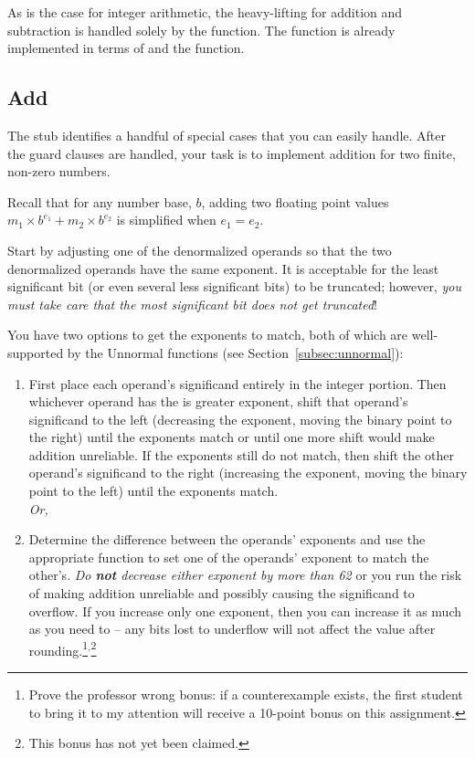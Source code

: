 As is the case for integer arithmetic, the heavy-lifting for addition and subtraction is handled solely by the  function.
The  function is already implemented in terms of  and the  function.

\subsection{Add}

The  stub identifies a handful of special cases that you can easily handle.
After the guard clauses are handled, your task is to implement addition for two finite, non-zero numbers.

Recall that for any number base, $b$, adding two floating point values $m_1 \times b^{e_1} + m_2 \times b^{e_2}$ is simplified when $e_1 = e_2$.

Start by adjusting one of the denormalized operands so that the two denormalized operands have the same exponent.
It is acceptable for the least significant bit (or even several less significant bits) to be truncated;
however, \textit{you must take care that the most significant bit does not get truncated}!

You have two options to get the exponents to match, both of which are well-supported by the Unnormal functions (see Section~\ref{subsec:unnormal}):
\begin{enumerate}
    \item First place each operand's significand entirely in the integer portion.
        Then whichever operand has the is greater exponent, shift that operand's significand to the left (decreasing the exponent, moving the binary point to the right) until the exponents match or until one more shift would make addition unreliable.
        If the exponents still do not match, then shift the other operand's significand to the right (increasing the exponent, moving the binary point to the left) until the exponents match. \\ \textit{Or,}
    \item Determine the difference between the operands' exponents and use the appropriate function to set one of the operands' exponent to match the other's.
        \textit{Do \textbf{not} decrease either exponent by more than 62} or you run the risk of making addition unreliable and possibly causing the significand to overflow.
        If you increase only one exponent, then you can increase it as much as you need to -- any bits lost to underflow will not affect the value after rounding.\footnote{
            Prove the professor wrong bonus: if a counterexample exists, the first student to bring it to my attention will receive a 10-point bonus on this assignment.
        }$^{,}$\footnote{
            This bonus has not yet been claimed.
        }
\end{enumerate}

